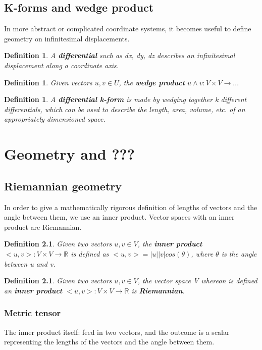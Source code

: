 \documentclass{book}
\newtheorem{defn}[equation]{Definition}
\begin{document}
\section{K-forms and wedge product}
In more abstract or complicated coordinate systems, it becomes useful to define geometry on infinitesimal displacements. 

\begin{defn}
	A \textbf{differential} such as dx, dy, dz describes an infinitesimal displacement along a coordinate axis. 
\end{defn}

\begin{defn}
	Given vectors $u, v \in U$, the \textbf{wedge product} $u \wedge v: V \times V \to...$ 
\end{defn}
\begin{defn}
	A \textbf{differential k-form} is made by wedging together k different differentials, which can be used to describe the length, area, volume, etc. of an appropriately dimensioned space. 
\end{defn}


\chapter{Geometry and ???}

\section{Riemannian geometry}
In order to give a mathematically rigorous definition of lengths of vectors and the angle between them, we use an inner product. Vector spaces with an inner product are Riemannian.

\begin{defn}
	Given two vectors $u,v \in V$, the \textbf{inner product} $<u,v> : V \times V \to \mathbb{R}$ is defined as $<u,v> = |u||v|cos(\theta)$, where $\theta$ is the angle between u and v. 
\end{defn}
\begin{defn}
	Given two vectors $u,v \in V$, the vector space V whereon is defined an \textbf{inner product} $<u,v> : V \times V \to \mathbb{R}$ is \textbf{Riemannian}.
	\end{defn}


\subsection{Metric tensor}
The inner product itself: feed in two vectors, and the outcome is a scalar representing the lengths of the vectors and the angle between them. 
\end{document}
